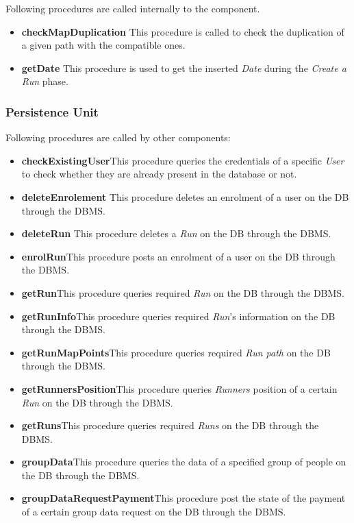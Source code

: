 \myparagraph{}
Following procedures are called internally to the component.
\begin{itemize}
  \item \textbf{checkMapDuplication} \quad This procedure is called to check the duplication of a given path with the compatible ones.
  \item \textbf{getDate} \quad This procedure is used to get the inserted \textit{Date} during the \textit{Create a Run} phase.
\end{itemize}

\subsubsection{Persistence Unit}
Following procedures are called by other components:
\begin{itemize}
  \item \textbf{checkExistingUser}\quad This procedure queries the credentials of a specific \textit{User} to check whether they are already present in the database or not.
  \item \textbf{deleteEnrolement} \quad This procedure deletes an enrolment of a user on the DB through the DBMS.
  \item \textbf{deleteRun} \quad This procedure deletes a \textit{Run} on the DB through the DBMS.
  \item \textbf{enrolRun}\quad This procedure posts an enrolment of a user on the DB through the DBMS.
  \item \textbf{getRun}\quad This procedure queries required \textit{Run} on the DB through the DBMS.
  \item \textbf{getRunInfo}\quad This procedure queries required \textit{Run}'s information on the DB through the DBMS.
  \item \textbf{getRunMapPoints}\quad This procedure queries required \textit{Run path} on the DB through the DBMS.
  \item \textbf{getRunnersPosition}\quad This procedure queries \textit{Runners} position of a certain \textit{Run} on the DB through the DBMS.
  \item \textbf{getRuns}\quad This procedure queries required \textit{Runs} on the DB through the DBMS.
  \item \textbf{groupData}\quad This procedure queries the data of a specified group of people on the DB through the DBMS.
  \item \textbf{groupDataRequestPayment}\quad This procedure post the state of the payment of a certain group data request on the DB through the DBMS.

\end{itemize}

